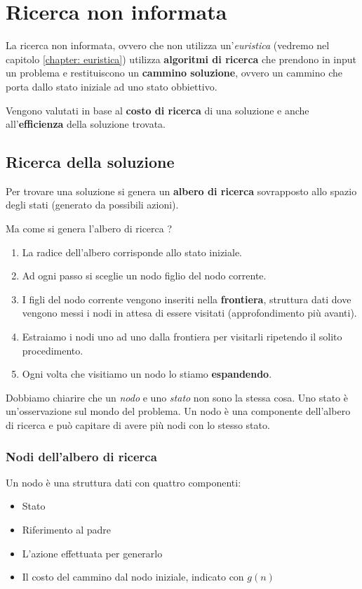 \chapter{Ricerca non informata} \label{chapter: ricerca non informata}
La ricerca non informata, ovvero che non utilizza un'\emph{euristica} (vedremo nel capitolo
\ref{chapter: euristica}) utilizza \textbf{algoritmi di ricerca} che prendono in input un
problema e restituiscono un \textbf{cammino soluzione}, ovvero un cammino che porta dallo
stato iniziale ad uno stato obbiettivo.

Vengono valutati in base al \textbf{costo di ricerca} di una soluzione e anche
all'\textbf{efficienza} della soluzione trovata.

\section{Ricerca della soluzione}
Per trovare una soluzione si genera un \textbf{albero di ricerca} sovrapposto allo spazio
degli stati (generato da possibili azioni).

Ma come si genera l'albero di ricerca ?
\begin{enumerate}
	\item La radice dell'albero corrisponde allo stato iniziale.
	\item Ad ogni passo si sceglie un nodo figlio del nodo corrente.
	\item I figli del nodo corrente vengono inseriti nella \textbf{frontiera}, struttura
	      dati dove vengono messi i nodi in attesa di essere visitati (approfondimento
	      pi\`u avanti).
	\item Estraiamo i nodi uno ad uno dalla frontiera per visitarli ripetendo il solito
	      procedimento.
	\item Ogni volta che visitiamo un nodo lo stiamo \textbf{espandendo}.
\end{enumerate}
Dobbiamo chiarire che un \emph{nodo} e uno \emph{stato} non sono la stessa cosa. Uno stato
\`e un'osservazione sul mondo del problema. Un nodo \`e una componente dell'albero di
ricerca e pu\`o capitare di avere pi\`u nodi con lo stesso stato.

\subsection{Nodi dell'albero di ricerca}
Un nodo \`e una struttura dati con quattro componenti:
\begin{itemize}
	\item Stato
	\item Riferimento al padre
	\item L'azione effettuata per generarlo
	\item Il costo del cammino dal nodo iniziale, indicato con $g(n)$
\end{itemize}

